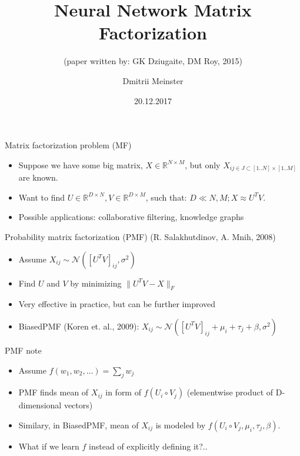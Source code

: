 \documentclass{beamer}
\title[NNMF]{Neural Network Matrix Factorization}
\subtitle{\tiny (paper written by: GK Dziugaite, DM Roy, 2015)}
\author[Dmitrii Meinster]{Dmitrii Meinster}
\institute[HSE, CS faculty, DS]{NRU HSE, CS faculty, Data Science programme}
\date{20.12.2017}
\begin{document}
\begin{frame}
  \titlepage
\end{frame}

\begin{frame}{Matrix factorization problem (MF)}
    \begin{itemize}
        \item Suppose we have some big matrix, $X \in \mathbb{R}^{N \times M}$, but only $X_{ij \in J \subset [1..N] \times [1..M]}$ are known.
        \item Want to find $U \in \mathbb{R}^{D \times N}, V \in \mathbb{R}^{D \times M}$, such that: $D \ll N, M; X \approx U^T V$.
        \item Possible applications: collaborative filtering, knowledge graphs
    \end{itemize}
\end{frame}

\begin{frame}{Probability matrix factorization (PMF)}
    (R. Salakhutdinov, A. Mnih, 2008)

    \begin{itemize}
        \item Assume $X_{ij} \sim \mathcal{N}([U^TV]_{ij}, \sigma^2)$
        \item Find $U$ and $V$ by minimizing $\|U^TV - X\|_{F}$
        \item Very effective in practice, but can be further improved
        \item BiasedPMF (Koren et. al., 2009): $X_{ij} \sim \mathcal{N}([U^TV]_{ij} + \mu_i + \tau_j + \beta, \sigma^2)$
    \end{itemize}
\end{frame}

\begin{frame}{PMF note}
    \begin{itemize}
        \item Assume $f(w_1, w_2, \ldots) = \sum_j w_j$
        \item PMF finds mean of $X_{ij}$ \newline in form of $f(U_i \circ V_j)$ (elementwise product of D-dimensional vectors)
        \item Similary, in BiasedPMF, mean of $X_{ij}$ is modeled by $f(U_i \circ V_j, \mu_i, \tau_j, \beta)$.
        \item What if we learn $f$ instead of explicitly defining  it?..
    \end{itemize}
\end{frame}
\end{document}
